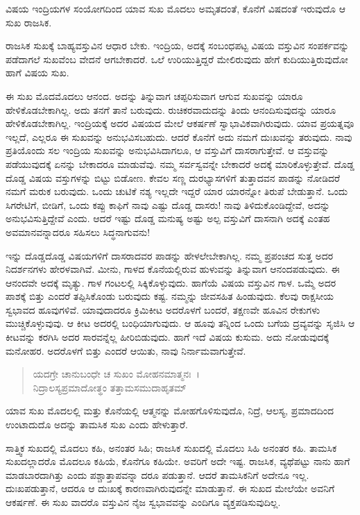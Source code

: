 {\small ವಿಷಯ ಇಂದ್ರಿಯಗಳ ಸಂಯೋಗದಿಂದ ಯಾವ ಸುಖ ಮೊದಲು ಅಮೃತದಂತೆ, ಕೊನೆಗೆ ವಿಷದಂತೆ ಇರುವುದೊ ಆ ಸುಖ ರಾಜಸಿಕ.}

ರಾಜಸಿಕ ಸುಖಕ್ಕೆ ಬಾಹ್ಯವಸ್ತುವಿನ ಆಧಾರ ಬೇಕು. ಇಂದ್ರಿಯ, ಅದಕ್ಕೆ ಸಂಬಂಧಪಟ್ಟ ವಿಷಯ ವಸ್ತುವಿನ ಸಂಪರ್ಕವನ್ನು ಪಡೆದಾಗಲೆ ಸುಖವೆಂಬ ವೇದನೆ ಆಗಬೇಕಾದರೆ. ಒಲೆ ಉರಿಯುತ್ತಿದ್ದರೆ ಮೇಲಿರುವುದು ಹೇಗೆ ಕುದಿಯುತ್ತಿರುವುದೋ ಹಾಗೆ ವಿಷಯ ಸುಖ.

ಈ ಸುಖ ಮೊದಮೊದಲು ಆನಂದ. ಅದನ್ನು ತಿನ್ನುವಾಗ ಚಪ್ಪರಿಸುವಾಗ ಆಗುವ ಸುಖವನ್ನು ಯಾರೂ ಹೇಳಿಕೊಡಬೇಕಾಗಿಲ್ಲ. ಅದು ತನಗೆ ತಾನೆ ಬರುವುದು. ರುಚಿಕರವಾದುದನ್ನು ತಿಂದು ಆನಂದಿಸುವುದನ್ನು ಯಾರೂ ಹೇಳಿಕೊಡಬೇಕಾಗಿಲ್ಲ. ಇಂದ್ರಿಯಕ್ಕೆ ಅದರ ವಿಷಯದ ಮೇಲೆ ಆಕರ್ಷಣೆ ಸ್ವಾಭಾವಿಕವಾಗಿರುವುದು. ಯಾವ ಪ್ರಯತ್ನವೂ ಇಲ್ಲದೆ, ಎಲ್ಲರೂ ಈ ಸುಖವನ್ನು ಅನುಭವಿಸಬಹುದು. ಆದರೆ ಕೊನೆಗೆ ಅದು ನಮಗೆ ದುಃಖವನ್ನು ತರುವುದು. ನಾವು ಪ್ರತಿಯೊಂದು ಸಲ ಇಂದ್ರಿಯ ಸುಖವನ್ನು ಅನುಭವಿಸಿದಾಗಲೂ, ಆ ವಸ್ತುವಿಗೆ ದಾಸರಾಗುತ್ತೇವೆ. ಆ ವಸ್ತುವನ್ನು ಪಡೆಯುವುದಕ್ಕೆ ಏನನ್ನು ಬೇಕಾದರೂ ಮಾಡುವೆವು. ನಮ್ಮ ಸರ್ವಸ್ವವನ್ನೇ ಬೇಕಾದರೆ ಅದಕ್ಕೆ ಮಾರಿಕೊಳ್ಳುತ್ತೇವೆ. ದೊಡ್ಡ ದೊಡ್ಡ ವಿಷಯ ವಸ್ತುಗಳನ್ನು ಬಿಟ್ಟು ಬಿಡೋಣ. ಕೇವಲ ಸಣ್ಣ ದುರಭ್ಯಾಸಗಳಿಗೆ ತುತ್ತಾದವನ ಪಾಡನ್ನು ನೋಡಿದರೆ ನಮಗೆ ಮರುಕ ಬರುವುದು. ಒಂದು ಚುಟಿಕೆ ನಶ್ಯ ಇಲ್ಲದೇ ಇದ್ದರೆ ಯಾರ ಯಾರನ್ನೋ ತಿರುಪೆ ಬೇಡುತ್ತಾನೆ. ಒಂದು ಸಿಗರೇಟಿಗೆ, ಬೀಡಿಗೆ, ಒಂದು ಕಪ್ಪು ಕಾಫಿಗೆ ನಾವು ಎಷ್ಟು ದೊಡ್ಡ ದಾಸರು! ನಾವು ತಿಳಿದುಕೊಂಡಿದ್ದೇವೆ, ಅದನ್ನು ಅನುಭವಿಸುತ್ತಿದ್ದೇವೆ ಎಂದು. ಆದರೆ ಇಷ್ಟು ದೊಡ್ಡ ಮನುಷ್ಯ ಅಷ್ಟು ಅಲ್ಪ ವಸ್ತುವಿಗೆ ದಾಸನಾಗಿ ಅದಕ್ಕೆ ಎಂತಹ ಅವಮಾನವನ್ನಾದರೂ ಸಹಿಸಲು ಸಿದ್ಧನಾಗುವನು!

ಇನ್ನು ದೊಡ್ಡದೊಡ್ಡ ವಿಷಯಗಳಿಗೆ ದಾಸರಾದವರ ಪಾಡನ್ನು ಹೇಳಲೇಬೇಕಾಗಿಲ್ಲ. ನಮ್ಮ ಪ್ರಪಂಚದ ಸುತ್ತ ಅದರ ನಿದರ್ಶನಗಳು ಹೇರಳವಾಗಿವೆ. ಮೀನು, ಗಾಳದ ಕೊನೆಯಲ್ಲಿರುವ ಹುಳುವನ್ನು ತಿನ್ನುವಾಗ ಆನಂದಪಡುವುದು. ಈ ಆನಂದವೇ ಅದಕ್ಕೆ ಮೃತ್ಯು. ಗಾಳ ಗಂಟಲಲ್ಲಿ ಸಿಕ್ಕಿಕೊಳ್ಳುವುದು. ಹಾಗೆಯೆ ವಿಷಯ ವಸ್ತುವಿನ ಗಾಳ. ಒಮ್ಮೆ ಅದರ ಪಾಶಕ್ಕೆ ಬಿತ್ತು ಎಂದರೆ ತಪ್ಪಿಸಿಕೊಂಡು ಬರುವುದು ಕಷ್ಟ. ನಮ್ಮನ್ನು ಜೀವಸಹಿತ ಹಿಂಡುವುದು. ಕೆಲವು ರಾಕ್ಷಸೀಯ ಸ್ವಭಾವದ ಹೂವುಗಳಿವೆ. ಯಾವುದಾದರೂ ಕ್ರಿಮಿಕೀಟ ಅದರೊಳಗೆ ಬಂದರೆ, ತಕ್ಷಣವೇ ಹೂವಿನ ರೇಕುಗಳು ಮುಚ್ಚಿಕೊಳ್ಳುವುವು. ಆ ಕೀಟ ಅದರಲ್ಲಿ ಬಂಧಿಯಾಗುವುದು. ಆ ಹೂವು ತನ್ನಿಂದ ಒಂದು ಬಗೆಯ ದ್ರವ್ಯವನ್ನು ಸೃಜಿಸಿ ಆ ಕೀಟವನ್ನು ಕರಗಿಸಿ ಅದರ ಸಾರವನ್ನೆಲ್ಲ ಹೀರಿಬಿಡುವುದು. ಹಾಗೆ ಇದೆ ವಿಷಯ ಕುಸುಮ. ಅದು ನೋಡುವುದಕ್ಕೆ ಮನೋಹರ. ಅದರೊಳಗೆ ಬಿತ್ತು ಎಂದರೆ ಆಯಿತು, ನಾವು ನಿರ್ನಾಮವಾಗುತ್ತೇವೆ.

\begin{verse}
ಯದಗ್ರೇ ಚಾನುಬಂಧೇ ಚ ಸುಖಂ ಮೋಹನಮಾತ್ಮನಃ~।\\ನಿದ್ರಾಲಸ್ಯಪ್ರಮಾದೋತ್ಥಂ ತತ್ತಾಮಸಮುದಾಹೃತಮ್ 
\end{verse}

{\small ಯಾವ ಸುಖ ಮೊದಲಲ್ಲಿ ಮತ್ತು ಕೊನೆಯಲ್ಲಿ ಆತ್ಮನನ್ನು ಮೋಹಗೊಳಿಸುವುದೊ, ನಿದ್ರೆ, ಆಲಸ್ಯ, ಪ್ರಮಾದದಿಂದ ಉಂಟಾದುದೊ ಅದನ್ನು ತಾಮಸಿಕ ಸುಖ ಎಂದು ಹೇಳುತ್ತಾರೆ.}

ಸಾತ್ತ್ವಿಕ ಸುಖದಲ್ಲಿ ಮೊದಲು ಕಹಿ, ಅನಂತರ ಸಿಹಿ; ರಾಜಸಿಕ ಸುಖದಲ್ಲಿ ಮೊದಲು ಸಿಹಿ ಅನಂತರ ಕಹಿ. ತಾಮಸಿಕ ಸುಖದಲ್ಲಾದರೊ ಮೊದಲೂ ಕಹಿಯೆ, ಕೊನೆಗೂ ಕಹಿಯೇ. ಅವರಿಗೆ ಅದೇ ಇಷ್ಟ. ರಾಜಸಿಕ, ವ್ಯಥೆಪಟ್ಟು ನಾನು ಹಾಗೆ ಮಾಡಬಾರದಾಗಿತ್ತು ಎಂದು ಪಶ್ಚಾತ್ತಾಪವನ್ನಾ ದರೂ ಪಡುತ್ತಾನೆ. ಆದರೆ ತಾಮಸಿಕನಿಗೆ ಅದೇನೂ ಇಲ್ಲ. ದುಃಖಪಡುತ್ತಾನೆ, ಆದರೂ ಆ ದುಃಖಕ್ಕೆ ಕಾರಣವಾಗಿರುವುದನ್ನೇ ಮಾಡುತ್ತಾನೆ. ಈ ಸುಖದ ಮೇಲೆಯೇ ಅವನಿಗೆ ಆಕರ್ಷಣೆ. ಈ ಸುಖ ವಾದರೊ ವಸ್ತುವಿನ ನೈಜ ಸ್ವಭಾವವನ್ನು ಎಂದಿಗೂ ವ್ಯಕ್ತಪಡಿಸುವುದಿಲ್ಲ.

